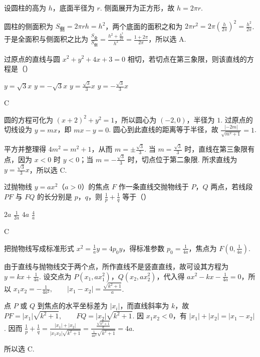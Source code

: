 \begin{solution}
设圆柱的高为 \(h\)，底面半径为 \(r\). 侧面展开为正方形，故
\(
h=2\pi r
\).

圆柱的侧面积为 \(S_{\text{侧}}=2\pi rh=h^{2}\)，两个底面的面积之和为
\(
2\pi r^{2}=2\pi\left(\frac{h}{2\pi}\right)^{2}=\frac{h^{2}}{2\pi}
\).
于是全面积与侧面积之比为
\(
\frac{S_{\text{全}}}{S_{\text{侧}}}=\frac{h^{2}+\frac{h^{2}}{2\pi}}{h^{2}}=\frac{1+2\pi}{2\pi}
\)，所以选 A.
\end{solution}

\begin{problem}
过原点的直线与圆 \(x^{2} + y^{2} + 4x + 3 = 0\) 相切，若切点在第三象限，则该直线的方程是（\quad）

\choices
    {\(y = \sqrt{3} x\)}
    {\(y = -\sqrt{3} x\)}
    {\(y = \frac{\sqrt{3}}{3} x\)}
    {\(y = -\frac{\sqrt{3}}{3} x\)}
\end{problem}

\begin{answer}
C
\end{answer}

\begin{solution}
圆的方程可化为
\(
(x+2)^{2}+y^{2}=1
\)，所以圆心为 \((-2,0)\)，半径为 \(1\). 过原点的切线设为 \(y=mx\)，即 \(mx-y=0\). 圆心到此直线的距离等于半径，故
\(
\frac{|-2m|}{\sqrt{m^{2}+1}}=1
\).

平方并整理得 \(4m^{2}=m^{2}+1\)，从而 \(m=\pm\frac{\sqrt{3}}{3}\). 当 \(m=\frac{\sqrt{3}}{3}\) 时，直线在第三象限有点，因为 \(x<0\) 时 \(y<0\)；当 \(m=-\frac{\sqrt{3}}{3}\) 时，切点位于第二象限. 所求直线为
\(
y=\frac{\sqrt{3}}{3}x
\)，所以选 C.
\end{solution}

\begin{problem}
过抛物线 \(y = ax^2\)（\(a > 0\)）的焦点 \(F\) 作一条直线交抛物线于 \(P\)，\(Q\) 两点，若线段 \(PF\) 与 \(FQ\) 的长分别是 \(p\)，\(q\)，则 \(\frac{1}{p} + \frac{1}{q}\) 等于（\quad）

\choices
    {\(2a\)}
    {\(\frac{1}{2a}\)}
    {\(4a\)}
    {\(\frac{4}{a}\)}
\end{problem}

\begin{answer}
C
\end{answer}

\begin{solution}
把抛物线写成标准形式
\(
x^{2}=\frac{1}{a}y=4p_{0}y
\)，得标准参数 \(p_{0}=\frac{1}{4a}\)，焦点为 \(F\left(0,\frac{1}{4a}\right)\).

由于直线与抛物线交于两个点，所作直线不是竖直直线，故可设其方程为 \(y=kx+\frac{1}{4a}\). 设交点为 \(P(x_{1},ax_{1}^{2})\)，\(Q(x_{2},ax_{2}^{2})\)，代入得
\(
ax^{2}-kx-\frac{1}{4a}=0
\)，所以
\(
x_{1}x_{2}=-\frac{1}{4a^{2}},\qquad |x_{1}-x_{2}|=\frac{\sqrt{k^{2}+1}}{a}
\).

点 \(P\) 或 \(Q\) 到焦点的水平坐标差为 \(|x_i|\)，而直线斜率为 \(k\)，故
\(
PF=|x_{1}|\sqrt{k^{2}+1},\qquad FQ=|x_{2}|\sqrt{k^{2}+1}
\).
因 \(x_{1}x_{2}<0\)，有 \(|x_{1}|+|x_{2}|=|x_{1}-x_{2}|\). 因而
\(
\frac{1}{p}+\frac{1}{q}=\frac{|x_{1}|+|x_{2}|}{|x_{1}x_{2}|\sqrt{k^{2}+1}}=\frac{\frac{\sqrt{k^{2}+1}}{a}}{\frac{1}{4a^{2}}\sqrt{k^{2}+1}}=4a
\).

所以选 C.
\end{solution}

